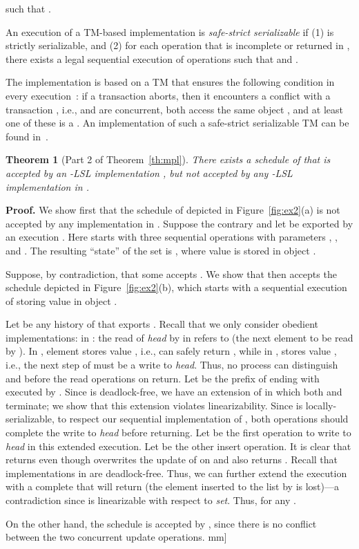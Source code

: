 \documentclass[11pt,pdftex,letterpaper]{article}
\newtheorem{theorem}{Theorem}
\newenvironment{proof}[1][Proof]{\noindent\textbf{#1.} }{\hfill \2mm]}
\begin{document}
such that . 

An execution  of a TM-based implementation is 
\emph{safe-strict serializable} if
(1)  is strictly serializable, and
(2) for each operation  that is incomplete or returned  in
, there exists a legal sequential execution of operations
 such that  and .

The implementation  is
based on a TM that ensures the following condition in every execution~\cite{GK09-progressiveness}: 
if a transaction  aborts, then it encounters a conflict with a transaction , i.e.,  
 and  are concurrent, both access the same object , and
at least one of these is a .
An implementation of such a safe-strict serializable TM can be
found in~\cite{KR11}. 
\begin{theorem}[Part 2 of Theorem~\ref{th:mpl}]
There exists a schedule  of  
that is accepted by an -LSL  implementation ,
but not accepted by \emph{any} -LSL implementation in .
\end{theorem}
\begin{proof}
We show first that the schedule  of  depicted
in Figure~\ref{fig:ex2}(a) is not accepted by any implementation in .
Suppose the contrary and let  be exported by an execution . 
Here  starts with three sequential  operations with
parameters , , and . The resulting ``state'' of the set is
, where value  is stored in object .   

Suppose, by contradiction, that some  accepts . 
We show that  then accepts the schedule  depicted in Figure~\ref{fig:ex2}(b), which starts with a sequential
execution of  storing value  in object . 

Let  be any history of  that exports .
Recall that we only consider obedient implementations:
in : the read of \emph{head} by  in  refers to  (the next element to be read by ). 
In , element  stores value ,
i.e.,  can safely return , while in
,  stores value , i.e., the next step of
 must be a write to \emph{head}.       
Thus, no process
can distinguish  and  
before the
read operations on  return. 
Let  be the prefix of  ending with 
executed by .
Since  is deadlock-free, we have an extension of  in
which both  and  terminate; we show that this extension violates linearizability. 
Since  is locally-serializable, to respect our sequential implementation
of , both operations should complete the write to \emph{head}
before returning. 
Let  be the first operation to write to
\emph{head} in this extended execution. 
Let  be the other insert operation.
It is clear that  returns  even though  overwrites the update of  on 
and also returns . 
Recall that implementations in  are deadlock-free. 
Thus,   
we can further extend the execution with a complete 
that will return  (the element inserted to the list by 
is lost)---a contradiction since  is linearizable with respect to \emph{set}. 
Thus,  for any .

On the other hand, the schedule  is accepted by , since
there is no conflict between the two concurrent update operations.
\end{proof}
\end{document}
